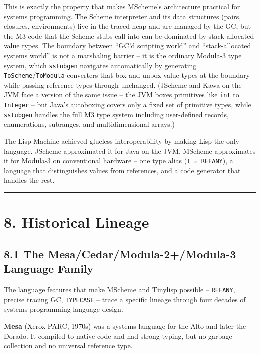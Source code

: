 \documentclass[
  12pt,
]{report}
\newcommand{\passthrough}[1]{#1}
\begin{document}
This is exactly the property that makes MScheme's architecture practical
for systems programming. The Scheme interpreter and its data structures
(pairs, closures, environments) live in the traced heap and are managed
by the GC, but the M3 code that the Scheme stubs call into can be
dominated by stack-allocated value types. The boundary between ``GC'd
scripting world'' and ``stack-allocated systems world'' is not a
marshaling barrier -- it is the ordinary Modula-3 type system, which
\passthrough{\lstinline!sstubgen!} navigates automatically by generating
\passthrough{\lstinline!ToScheme!}/\passthrough{\lstinline!ToModula!}
converters that box and unbox value types at the boundary while passing
reference types through unchanged. (JScheme and Kawa on the JVM face a
version of the same issue -- the JVM boxes primitives like
\passthrough{\lstinline!int!} to \passthrough{\lstinline!Integer!} --
but Java's autoboxing covers only a fixed set of primitive types, while
\passthrough{\lstinline!sstubgen!} handles the full M3 type system
including user-defined records, enumerations, subranges, and
multidimensional arrays.)

The Lisp Machine achieved glueless interoperability by making Lisp the
only language. JScheme approximated it for Java on the JVM. MScheme
approximates it for Modula-3 on conventional hardware -- one type alias
(\passthrough{\lstinline!T = REFANY!}), a language that distinguishes
values from references, and a code generator that handles the rest.

\begin{center}\rule{0.5\linewidth}{0.5pt}\end{center}

\section{8. Historical Lineage}\label{historical-lineage}

\subsection{8.1 The Mesa/Cedar/Modula-2+/Modula-3 Language
Family}\label{the-mesacedarmodula-2modula-3-language-family}

The language features that make MScheme and Tinylisp possible --
\passthrough{\lstinline!REFANY!}, precise tracing GC,
\passthrough{\lstinline!TYPECASE!} -- trace a specific lineage through
four decades of systems programming language design.

\textbf{Mesa} (Xerox PARC, 1970s) was a systems language for the Alto
and later the Dorado. It compiled to native code and had strong typing,
but no garbage collection and no universal reference type.
\end{document}
